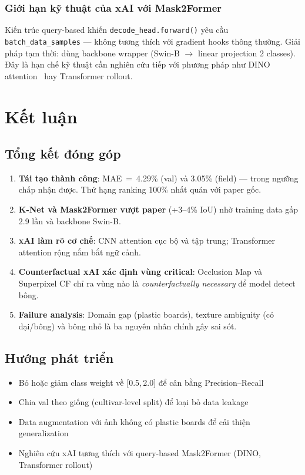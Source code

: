 \documentclass[12pt, a4paper]{article}
\begin{document}
\subsubsection{Giới hạn kỹ thuật của xAI với Mask2Former}
Kiến trúc query-based khiến \texttt{decode\_head.forward()} yêu cầu \texttt{batch\_data\_samples} --- không tương thích với gradient hooks thông thường. Giải pháp tạm thời: dùng backbone wrapper (Swin-B $\to$ linear projection 2 classes). Đây là hạn chế kỹ thuật cần nghiên cứu tiếp với phương pháp như DINO attention~\cite{liu2021swin} hay Transformer rollout.

\section{Kết luận}
\label{sec:conclusion}

\subsection{Tổng kết đóng góp}

\begin{enumerate}
  \item \textbf{Tái tạo thành công}: MAE~=~4.29\% (val) và 3.05\% (field) --- trong ngưỡng chấp nhận được. Thứ hạng ranking 100\% nhất quán với paper gốc.
  \item \textbf{K-Net và Mask2Former vượt paper} (+3--4\% IoU) nhờ training data gấp 2.9 lần và backbone Swin-B.
  \item \textbf{xAI làm rõ cơ chế}: CNN attention cục bộ và tập trung; Transformer attention rộng nắm bắt ngữ cảnh.
  \item \textbf{Counterfactual xAI xác định vùng critical}: Occlusion Map và Superpixel CF chỉ ra vùng nào là \textit{counterfactually necessary} để model detect bông.
  \item \textbf{Failure analysis}: Domain gap (plastic boards), texture ambiguity (cỏ dại/bông) và bông nhỏ là ba nguyên nhân chính gây sai sót.
\end{enumerate}

\subsection{Hướng phát triển}

\begin{itemize}
  \item Bỏ hoặc giảm class weight về [0.5,\,2.0] để cân bằng Precision--Recall
  \item Chia val theo giống (cultivar-level split) để loại bỏ data leakage
  \item Data augmentation với ảnh không có plastic boards để cải thiện generalization
  \item Nghiên cứu xAI tương thích với query-based Mask2Former (DINO, Transformer rollout)
\end{itemize}



\end{document}
